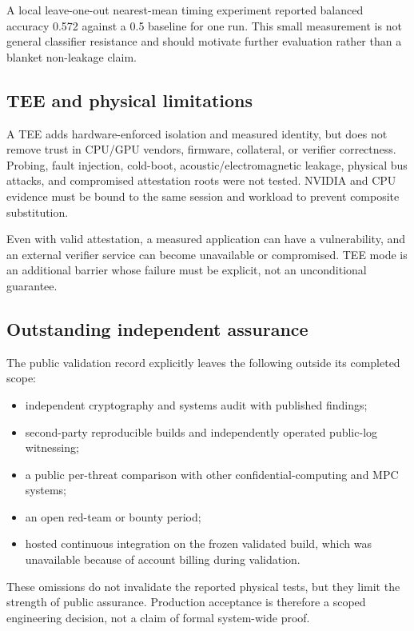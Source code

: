A local leave-one-out nearest-mean timing experiment reported balanced accuracy 0.572 against a 0.5 baseline for one run. This small measurement is not general classifier resistance and should motivate further evaluation rather than a blanket non-leakage claim.

\subsection{TEE and physical limitations}

A TEE adds hardware-enforced isolation and measured identity, but does not remove trust in CPU/GPU vendors, firmware, collateral, or verifier correctness. Probing, fault injection, cold-boot, acoustic/electromagnetic leakage, physical bus attacks, and compromised attestation roots were not tested. NVIDIA and CPU evidence must be bound to the same session and workload to prevent composite substitution.

Even with valid attestation, a measured application can have a vulnerability, and an external verifier service can become unavailable or compromised. TEE mode is an additional barrier whose failure must be explicit, not an unconditional guarantee.

\subsection{Outstanding independent assurance}

The public validation record explicitly leaves the following outside its completed scope:
\begin{itemize}
  \item independent cryptography and systems audit with published findings;
  \item second-party reproducible builds and independently operated public-log witnessing;
  \item a public per-threat comparison with other confidential-computing and MPC systems;
  \item an open red-team or bounty period;
  \item hosted continuous integration on the frozen validated build, which was unavailable because of account billing during validation.
\end{itemize}
These omissions do not invalidate the reported physical tests, but they limit the strength of public assurance. Production acceptance is therefore a scoped engineering decision, not a claim of formal system-wide proof.
